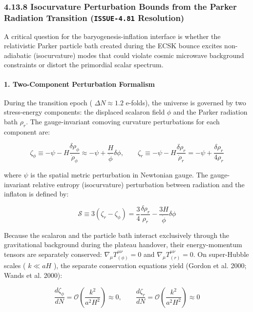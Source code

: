 \documentclass[11pt,a4paper]{article}
\theoremstyle{definition}\newtheorem{definition}{Definition}
\theoremstyle{remark}\newtheorem{remark}{Remark}
\begin{document}
\subsubsection{4.13.8 Isocurvature Perturbation Bounds from the Parker Radiation Transition (\texttt{ISSUE-4.81} Resolution)}

A critical question for the baryogenesis-inflation interface is whether the relativistic Parker particle bath created during the ECSK bounce excites non-adiabatic (isocurvature) modes that could violate cosmic microwave background constraints or distort the primordial scalar spectrum.
\paragraph{1. Two-Component Perturbation Formalism}

During the transition epoch ( $\Delta N \approx 1.2$ e-folds), the universe is governed by two stress-energy components: the displaced scalaron field $\phi$ and the Parker radiation bath $\rho_r$. The gauge-invariant comoving curvature perturbations for each component are:


\begin{equation}
\zeta_\phi \equiv -\psi - H \frac{\delta\rho_\phi}{\dot{\rho}_\phi} \approx -\psi + \frac{H}{\dot{\phi}} \delta\phi, \qquad \zeta_r \equiv -\psi - H \frac{\delta\rho_r}{\dot{\rho}_r} = -\psi + \frac{\delta\rho_r}{4\rho_r}
\end{equation}


where $\psi$ is the spatial metric perturbation in Newtonian gauge. The gauge-invariant relative entropy (isocurvature) perturbation between radiation and the inflaton is defined by:


\begin{equation}
\mathcal{S} \equiv 3(\zeta_r - \zeta_\phi) = \frac{3}{4} \frac{\delta\rho_r}{\rho_r} - \frac{3 H}{\dot{\phi}} \delta\phi
\end{equation}


Because the scalaron and the particle bath interact exclusively through the gravitational background during the plateau handover, their energy-momentum tensors are separately conserved: $\nabla_\mu T^{\mu\nu}_{(\phi)} = 0$ and $\nabla_\mu T^{\mu\nu}_{(r)} = 0$. On super-Hubble scales ( $k \ll aH$ ), the separate conservation equations yield (Gordon et al. 2000; Wands et al. 2000):


\begin{equation}
\frac{d\zeta_\phi}{dN} = \mathcal{O}\left(\frac{k^2}{a^2 H^2}\right) \approx 0, \qquad \frac{d\zeta_r}{dN} = \mathcal{O}\left(\frac{k^2}{a^2 H^2}\right) \approx 0
\end{equation}
\end{document}
